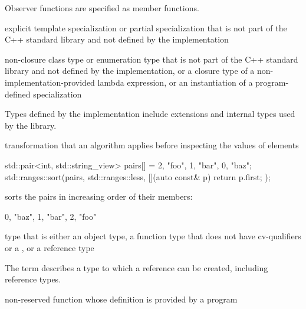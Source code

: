 \begin{defnote}
Observer functions are specified as
member functions.
\end{defnote}

%
explicit template specialization or partial specialization
that is not part of the C++ standard library and
not defined by the implementation

%
non-closure class type or enumeration type
that is not part of the C++ standard library and
not defined by the implementation,
or a closure type of a non-implementation-provided lambda expression,
or an instantiation of a program-defined specialization

\begin{defnote}
Types defined by the implementation include
extensions and internal types used by the library.
\end{defnote}

%
 transformation that
an algorithm applies before inspecting the values of elements

\begin{example}
\begin{codeblock}
std::pair<int, std::string_view> pairs[] = {{2, "foo"}, {1, "bar"}, {0, "baz"}};
std::ranges::sort(pairs, std::ranges::less{}, [](auto const& p) { return p.first; });
\end{codeblock}
sorts the pairs in increasing order of their  members:
\begin{codeblock}
{{0, "baz"}, {1, "bar"}, {2, "foo"}}
\end{codeblock}
\end{example}

%
type that is either an
object type, a function type that does not have cv-qualifiers or a
, or a reference type

\begin{defnote}
The term describes a type to which a reference can be created,
including reference types.
\end{defnote}

%
non-reserved function
whose definition is provided by a \Cpp{} program

